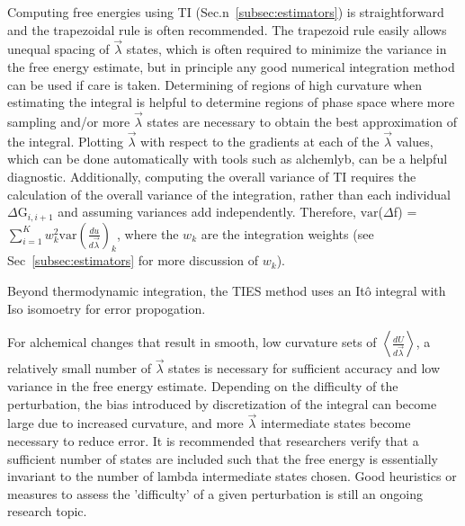 \documentclass[9pt,bestpractices]{livecoms}
\newcommand{\expect}[1]{\left\langle{#1}\right\rangle}
\begin{document}
Computing free energies using TI (Sec.n~\ref{subsec:estimators}) is straightforward and the trapezoidal rule is often recommended. The trapezoid rule easily allows unequal spacing of $\vec{\lambda}$ states, which is often required to minimize the variance in the free energy estimate, but in principle any good numerical integration method can be used if care is taken.  
Determining of regions of high curvature when estimating the integral is helpful to determine regions of phase space where more sampling and/or more $\vec{\lambda}$ states are necessary to obtain the best approximation of the integral. Plotting $\vec{\lambda}$ with respect to the gradients at each of the $\vec{\lambda}$ values, which can be done automatically with tools such as alchemlyb,  can be a helpful diagnostic. 
Additionally, computing the overall variance of TI requires the calculation of the overall variance of the integration, rather than each individual $\Delta$G$_{i,i+1}$ and assuming variances add independently. 
Therefore, $\mathrm{var}$($\Delta$f) = $\sum_{i=1}^{K}w_{k}^2 \mathrm{var}(\frac{du}{d\vec{\lambda}})_{k}$, where the $w_k$ are the integration weights (see Sec~\ref{subsec:estimators} for more discussion of $w_k$).


Beyond thermodynamic integration, the TIES method\cite{bhati2017} uses an It\^{o} integral with Iso isomoetry for error propogation.

For alchemical changes that result in smooth, low curvature sets of $\expect{\frac{dU}{d\vec{\lambda}}}$, a relatively small number of $\vec{\lambda}$ states is necessary for sufficient accuracy and low variance in the free energy estimate. 
Depending on the difficulty of the perturbation, the bias introduced by discretization of the integral can become large due to increased curvature, and more $\vec{\lambda}$ intermediate states become necessary to reduce error.
It is recommended that researchers verify that a sufficient number of states are included such that the free energy is essentially invariant to the number of lambda intermediate states chosen. Good heuristics or measures to assess the 'difficulty' of a given perturbation is still an ongoing research topic. 
\end{document}
